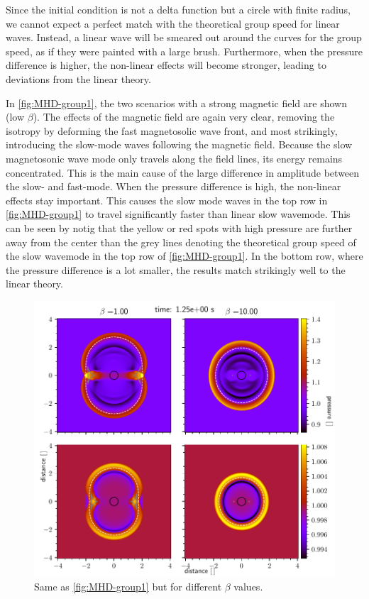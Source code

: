 Since the initial condition is not a delta function but a circle with finite radius, we cannot expect a perfect match with the theoretical group speed for linear waves.
Instead, a linear wave will be smeared out around the curves for the group speed, as if they were painted with a large brush.
Furthermore, when the pressure difference is higher, the non-linear effects will become stronger, leading to deviations from the linear theory.

In \cref{fig:MHD-group1}, the two scenarios with a strong magnetic field are shown (low $\beta$).
The effects of the magnetic field are again very clear, removing the isotropy by deforming the fast magnetosolic wave front, and most strikingly, introducing the slow-mode waves following the magnetic field.
Because the slow magnetosonic wave mode only travels along the field lines, its energy remains concentrated. This is the main cause of the large difference in amplitude between the slow- and fast-mode.
When the pressure difference is high, the non-linear effects stay important. 
This causes the slow mode waves in the top row in \cref{fig:MHD-group1} to travel significantly faster than linear slow wavemode.
This can be seen by notig that the yellow or red spots with high pressure are further away from the center than the grey lines denoting the theoretical group speed of the slow wavemode in the top row of \cref{fig:MHD-group1}.
In the bottom row, where the pressure difference is a lot smaller, the results match strikingly well to the linear theory.

\begin{figure}[H]
	\centering
	\includegraphics[width=\linewidth]{images/group-speed-pressure2.pdf}
	\caption{Same as \cref{fig:MHD-group1} but for different $\beta$ values.}
	\label{fig:MHD-group2}
\end{figure}


